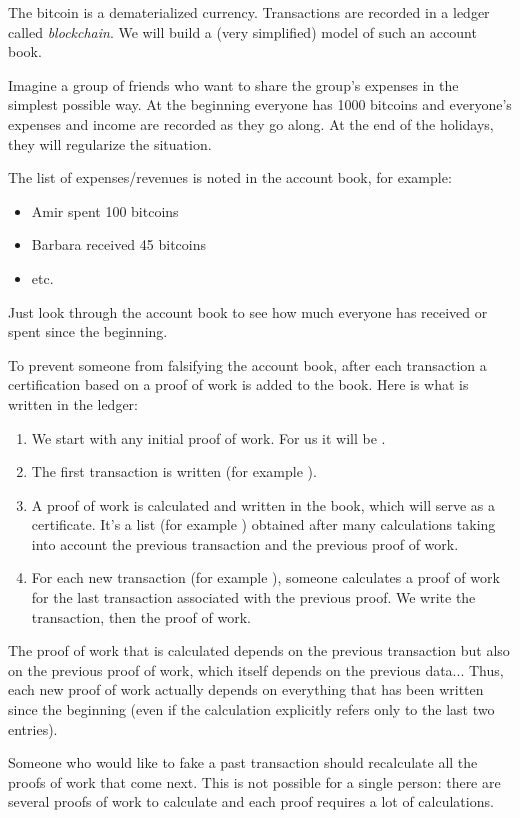 \documentclass[11pt,class=report,crop=false]{standalone}
\begin{document}

\begin{cours}

The bitcoin is a dematerialized currency. Transactions are recorded in a ledger called \emph{blockchain}. We will build a (very simplified) model of such an account book.


Imagine a group of friends who want to share the group's expenses in the simplest possible way. At the beginning everyone has 1000 bitcoins and everyone's expenses and income are recorded as they go along. 
At the end of the holidays, they will regularize the situation.

The list of expenses/revenues is noted in the account book, for example:
\begin{itemize}
  \item \og{}Amir spent 100 bitcoins\fg{}
  \item \og{}Barbara received 45 bitcoins\fg{}
  \item etc.
\end{itemize}
Just look through the account book to see how much everyone has received or spent since the beginning.

\bigskip

To prevent someone from falsifying the account book, after each transaction a certification based on a proof of work is added to the book.
Here is what is written in the ledger:
\begin{enumerate}
  \item We start with any initial proof of work. For us it will be 
  \ci{[0,0,0,0,0,0]}.
  \item The first transaction is written (for example ).
  \item A proof of work is calculated and written in the book, which will serve as a certificate. It's a list
  (for example \ci{[56,42,10,98,2,34]}) obtained after many calculations taking into account the previous transaction and the previous proof of work.
  \item For each new transaction (for example ), someone calculates a proof of work for the last transaction associated with the previous proof. We write the transaction, then the proof of work.
\end{enumerate}



The proof of work that is calculated depends on the previous transaction but also on the previous proof of work, which itself depends on the previous data... Thus, each new proof of work actually depends on everything that has been written since the beginning (even if the calculation explicitly refers only to the last two entries).

Someone who would like to fake a past transaction should recalculate all the proofs of work that come next. This is not possible for a single person: there are several proofs of work to calculate and each proof requires a lot of calculations.
\end{cours}
\end{document}

